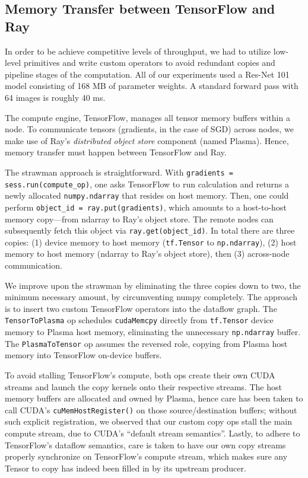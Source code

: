 \subsection{Memory Transfer between TensorFlow and Ray}

In order to be achieve competitive levels of throughput, we had to utilize low-level primitives and write custom operators to avoid redundant copies and pipeline stages of the computation. All of our experiments used a Res-Net 101 model consisting of 168 MB of parameter weights. A standard forward pass with 64 images is roughly 40 ms.

The compute engine, TensorFlow, manages all tensor memory buffers within a node.  To communicate tensors (gradients, in the case of SGD) across nodes, we make use of Ray's \textit{distributed object store} component (named Plasma).  Hence, memory transfer must happen between TensorFlow and Ray.

The strawman approach is straightforward.  With \texttt{gradients = sess.run(compute\_op)}, one asks TensorFlow to run calculation and returns a newly allocated \texttt{numpy.ndarray} that resides on host memory.  Then, one could perform \texttt{object\_id = ray.put(gradients)}, which amounts to a host-to-host memory copy---from ndarray to Ray's object store.  The remote nodes can subsequently fetch this object via \texttt{ray.get(object\_id)}.  In total there are three copies: (1) device memory to host memory (\texttt{tf.Tensor} to \texttt{np.ndarray}), (2) host memory to host memory (ndarray to Ray's object store), then (3) across-node communication.

We improve upon the strawman by eliminating the three copies down to two, the minimum necessary amount, by circumventing numpy completely.  The approach is to insert two custom TensorFlow operators into the dataflow graph.  The \texttt{TensorToPlasma} op schedules \texttt{cudaMemcpy} directly from \texttt{tf.Tensor} device memory to Plasma host memory, eliminating the unnecessary \texttt{np.ndarray} buffer.  The \texttt{PlasmaToTensor} op assumes the reversed role, copying from Plasma host memory into TensorFlow on-device buffers.

To avoid stalling TensorFlow's compute, both ops create their own CUDA streams and launch the copy kernels onto their respective streams.  The host memory buffers are allocated and owned by Plasma, hence care has been taken to call CUDA's \texttt{cuMemHostRegister()} on those source/destination buffers; without such explicit registration, we observed that our custom copy ops stall the main compute stream, due to CUDA's ``default stream semantics''.  Lastly, to adhere to TensorFlow's dataflow semantics, care is taken to have our own copy streams properly synchronize on TensorFlow's compute stream, which makes sure any Tensor to copy has indeed been filled in by its upstream producer.

